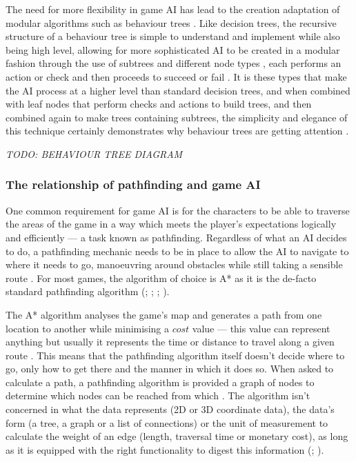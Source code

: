 \documentclass[11pt, a4paper]{article}
\begin{document}
The need for more flexibility in game AI has lead to the creation adaptation of modular algorithms such as behaviour trees \parencite[1]{lim2010evolving}. Like decision trees, the recursive structure of a behaviour tree is simple to understand and implement while also being high level, allowing for more sophisticated AI to be created in a modular fashion through the use of subtrees and different node types \parencite[144]{shoulson2011parameterizing}, each performs an action or check and then proceeds to succeed or fail \parencite[4]{lim2010evolving}. It is these types that make the AI process at a higher level than standard decision trees, and when combined with leaf nodes that perform checks and actions to build trees, and then combined again to make trees containing subtrees, the simplicity and elegance of this technique certainly demonstrates why behaviour trees are getting attention \parencite[144]{shoulson2011parameterizing}.

\emph{TODO: BEHAVIOUR TREE DIAGRAM}

\subsubsection{The relationship of pathfinding and game AI}
\label{subsubsec:theRelationshipOfPathfindingAndGameAI}

One common requirement for game AI is for the characters to be able to traverse the areas of the game in a way which meets the player's expectations logically and efficiently --- a task known as pathfinding. Regardless of what an AI decides to do, a pathfinding mechanic needs to be in place to allow the AI to navigate to where it needs to go, manoeuvring around obstacles while still taking a sensible route \parencite[60]{graham2003pathfinding}. For most games, the algorithm of choice is A* as it is the de-facto standard pathfinding algorithm (\cite[197]{millington2019ai}; \cite[2]{botea2004near}; \cite[64]{nareyek2004ai}; \cite[73]{leigh2007using}).

The A* algorithm analyses the game's map and generates a path from one location to another while minimising a $cost$ value --- this value can represent anything but usually it represents the time or distance to travel along a given route \parencite[44]{yap2002grid}. This means that the pathfinding algorithm itself doesn't decide where to go, only how to get there and the manner in which it does so. When asked to calculate a path, a pathfinding algorithm is provided a graph of nodes to determine which nodes can be reached from which \parencite[61]{nareyek2004ai}. The algorithm isn't concerned in what the data represents (2D or 3D coordinate data), the data's form (a tree, a graph or a list of connections) or the unit of measurement to calculate the weight of an edge (length, traversal time or monetary cost), as long as it is equipped with the right functionality to digest this information (\cite[277]{millington2019ai}; \cite[60]{graham2003pathfinding}).
\end{document}
